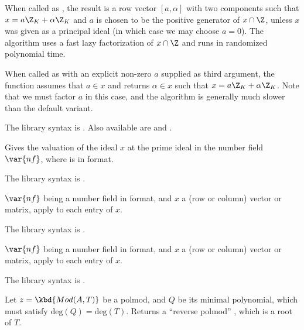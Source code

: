 \item When called as , the result is a row vector
$[a,\alpha]$ with two components such that $x=a\Z_K+\alpha\Z_K$ and $a$ is
chosen to be the positive generator of $x\cap\Z$, unless $x$ was given as a
principal ideal (in which case we may choose $a = 0$). The algorithm
uses a fast lazy factorization of $x\cap \Z$ and runs in randomized
polynomial time.

\item When called as  with an explicit non-zero $a$
supplied as third argument, the function assumes that $a \in x$ and returns
$\alpha\in x$ such that $x = a\Z_K + \alpha\Z_K$. Note that we must factor
$a$ in this case, and the algorithm is generally much slower than the
default variant.

The library syntax is .
Also available are
 and
.

\label{se:idealval}
Gives the valuation of the ideal $x$ at the prime ideal  in the
number field $\var{nf}$, where  is in  format.

The library syntax is .

\label{se:matalgtobasis}
$\var{nf}$ being a number field in  format, and $x$ a
(row or column) vector or matrix, apply  to each entry
of $x$.

The library syntax is .

\label{se:matbasistoalg}
$\var{nf}$ being a number field in  format, and $x$ a
(row or column) vector or matrix, apply  to each entry
of $x$.

The library syntax is .

\label{se:modreverse}
Let $z = \kbd{Mod(A, T)}$ be a polmod, and $Q$ be its minimal
polynomial, which must satisfy $\text{deg}(Q) = \text{deg}(T)$.
Returns a ``reverse polmod'' , which is a root of $T$.

